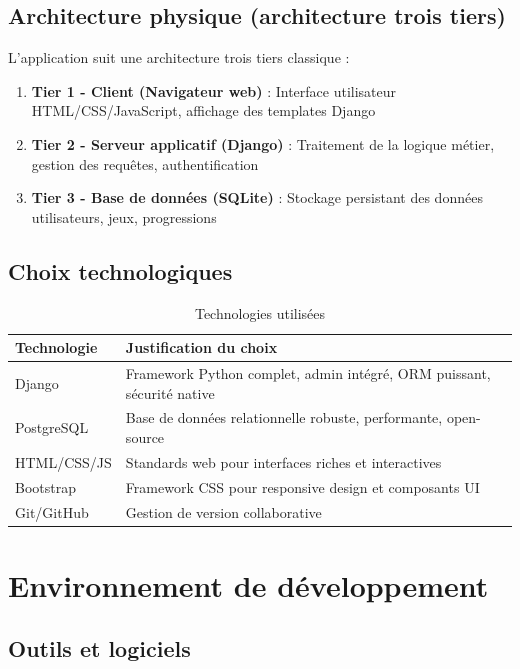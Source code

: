 \documentclass[12pt,a4paper]{report}
\begin{document}
\subsection{Architecture physique (architecture trois tiers)}

L'application suit une architecture trois tiers classique :

\begin{enumerate}
    \item \textbf{Tier 1 - Client (Navigateur web)} : Interface utilisateur HTML/CSS/JavaScript, affichage des templates Django
    \item \textbf{Tier 2 - Serveur applicatif (Django)} : Traitement de la logique métier, gestion des requêtes, authentification
    \item \textbf{Tier 3 - Base de données (SQLite)} : Stockage persistant des données utilisateurs, jeux, progressions
\end{enumerate}

\subsection{Choix technologiques}

\begin{table}[ht]
\centering
\begin{tabular}{|p{4cm}|p{10cm}|}
\hline
\textbf{Technologie} & \textbf{Justification du choix} \\
\hline
Django & Framework Python complet, admin intégré, ORM puissant, sécurité native \\
\hline
PostgreSQL & Base de données relationnelle robuste, performante, open-source \\
\hline
HTML/CSS/JS & Standards web pour interfaces riches et interactives \\
\hline
Bootstrap & Framework CSS pour responsive design et composants UI \\
\hline
Git/GitHub & Gestion de version collaborative \\
\hline
\end{tabular}
\caption{Technologies utilisées}
\end{table}

\section{Environnement de développement}

\subsection{Outils et logiciels}
\end{document}
